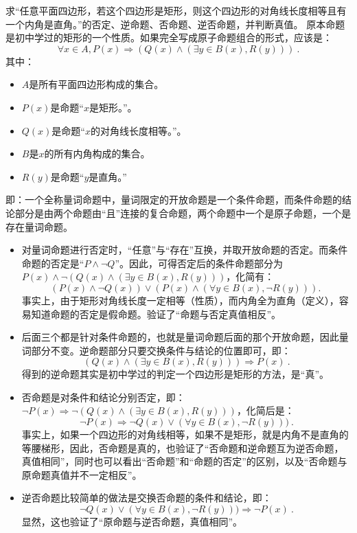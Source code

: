 \begin{exercise}{求“任意平面四边形，若这个四边形是矩形，则这个四边形的对角线长度相等且有一个内角是直角。”的否定、逆命题、否命题、逆否命题，并判断真值。}
原本命题是初中学过的矩形的一个性质。如果完全写成原子命题组合的形式，应该是：
$$\forall x\in A,P(x)\Rightarrow (Q(x)\land (\exists y\in B(x),R(y)))~.$$
其中：
\begin{itemize}
\item $A$是所有平面四边形构成的集合。
\item $P(x)$是命题“$x$是矩形。”。
\item $Q(x)$是命题“$x$的对角线长度相等。”。
\item $B$是$x$的所有内角构成的集合。
\item $R(y)$是命题“$y$是直角。”
\end{itemize}
即：一个全称量词命题中，量词限定的开放命题是一个条件命题，而条件命题的结论部分是由两个命题由“且”连接的复合命题，两个命题中一个是原子命题，一个是存在量词命题。
\begin{itemize}
\item 对量词命题进行否定时，“任意”与“存在”互换，并取开放命题的否定。而条件命题的否定是“$P\land\lnot Q$”。因此，可得否定后的条件命题部分为$P(x)\land\lnot(Q(x)\land (\exists y\in B(x),R(y)))$，化简有：
$$(P(x)\land\lnot Q(x))\lor(P(x)\land(\forall y\in B(x),\lnot R(y))).~$$
事实上，由于矩形对角线长度一定相等（性质），而内角全为直角（定义），容易知道命题的否定是假命题。验证了“命题与否定真值相反”。
\item 后面三个都是针对条件命题的，也就是量词命题后面的那个开放命题，因此量词部分不变。逆命题部分只要交换条件与结论的位置即可，即：
$$(Q(x)\land (\exists y\in B(x),R(y)))\Rightarrow P(x)~.$$
得到的逆命题其实是初中学过的判定一个四边形是矩形的方法，是“真”。
\item 否命题是对条件和结论分别否定，即：$\lnot P(x)\Rightarrow\lnot(Q(x)\land (\exists y\in B(x),R(y)))$，化简后是：
$$\lnot P(x)\Rightarrow\lnot Q(x)\lor (\forall y\in B(x),\lnot R(y)))~.$$
事实上，如果一个四边形的对角线相等，如果不是矩形，就是内角不是直角的等腰梯形，因此，否命题是真的，也验证了“否命题和逆命题互为逆否命题，真值相同”，同时也可以看出“否命题”和“命题的否定”的区别，以及“否命题与原命题真值并不一定相反”。
\item 逆否命题比较简单的做法是交换否命题的条件和结论，即：
$$\lnot Q(x)\lor (\forall y\in B(x),\lnot R(y)))\Rightarrow\lnot P(x)~.$$
显然，这也验证了“原命题与逆否命题，真值相同”。
\end{itemize}
\end{exercise}
